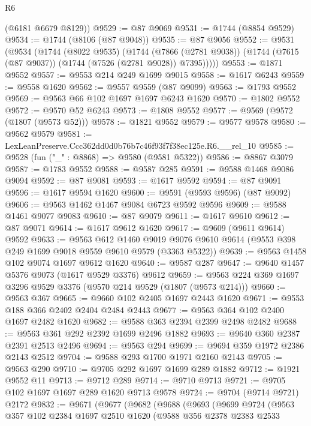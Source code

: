 \begin{lexlean}{R6}
\begin{coremodule}
      (@6181 @6679 @8129))
@9529 := @87 @9069
@9531 := @1744 (@8854 @9529)
@9534 := @1744 (@8106 (@87 @9048))
@9535 := @87 @9056
@9552 := @9531
    (@9534
      (@1744
        (@8022 @9535)
        (@1744
          (@7866 (@2781 @9038))
          (@1744 (@7615 (@87 @9037)) (@1744 (@7526 (@2781 @9028)) @7395)))))
@9553 := @1871 @9552
@9557 := @9553 @214 @249 @1699 @9015
@9558 := @1617 @6243
@9559 := @9558 @1620
@9562 := @9557 @9559 (@87 @9099)
@9563 := @1793 @9552
@9569 := @9563 @66 @102 @1697 @1697 @6243 @1620
@9570 := @1802 @9552
@9572 := @9570 @52 @6243
@9573 := @1808 @9552
@9577 := @9569 (@9572 (@1807 (@9573 @52)))
@9578 := @1821 @9552
@9579 := @9577 @9578
@9580 := @9562 @9579
@9581 := LexLeanPreserve.Ccc362dd0d0b76b7c46f93f7f38ec125e.R6.__rel_10
@9585 := @9528 (fun ("_" : @8868) => @9580 (@9581 @5322))
@9586 := @8867 @3079
@9587 := @1783 @9552
@9588 := @9587 @285
@9591 := @9588 @1468 @9086 @9094
@9592 := @87 @9081
@9593 := @1617 @9592
@9594 := @87 @9091
@9596 := @1617 @9594 @1620
@9600 := @9591 (@9593 @9596) (@87 @9092)
@9606 := @9563 @1462 @1467 @9084 @6723 @9592 @9596
@9609 := @9588 @1461 @9077 @9083
@9610 := @87 @9079
@9611 := @1617 @9610
@9612 := @87 @9071
@9614 := @1617 @9612 @1620
@9617 := @9609 (@9611 @9614) @9592
@9633 := @9563
    @612
    @1460
    @9019
    @9076
    @9610
    @9614
    (@9553 @398 @249 @1699 @9018 @9559 @9610 @9579 (@3363 @5322))
@9639 := @9563 @1458 @102 @9074 @1697 @9612 @1620
@9640 := @9587 @287
@9647 := @9640 @1457 @5376 @9073 (@1617 @9529 @3376) @9612
@9659 := @9563 @224 @369 @1697 @3296 @9529 @3376 (@9570 @214 @9529 (@1807 (@9573 @214)))
@9660 := @9563 @367
@9665 := @9660 @102 @2405 @1697 @2443 @1620
@9671 := @9553 @188 @366 @2402 @2404 @2484 @2443
@9677 := @9563 @364 @102 @2400 @1697 @2482 @1620
@9682 := @9588 @363 @2394 @2399 @2498 @2482
@9688 := @9563 @361 @292 @2392 @1699 @2496 @1882
@9693 := @9640 @360 @2387 @2391 @2513 @2496
@9694 := @9563 @294
@9699 := @9694 @359 @1972 @2386 @2143 @2512
@9704 := @9588 @293 @1700 @1971 @2160 @2143
@9705 := @9563 @290
@9710 := @9705 @292 @1697 @1699 @289 @1882
@9712 := @1921 @9552 @11
@9713 := @9712 @289
@9714 := @9710 @9713
@9721 := @9705 @102 @1697 @1697 @289 @1620 @9713 @9578
@9724 := @9704 (@9714 @9721) @2172
@9832 := @9671
    (@9677
      (@9682
        (@9688
          (@9693
            (@9699
              @9724
              (@9563
                @357
                @102
                @2384
                @1697
                @2510
                @1620
                (@9588
                  @356
                  @2378
                  @2383
                  @2533

\end{coremodule}
\end{lexlean}
